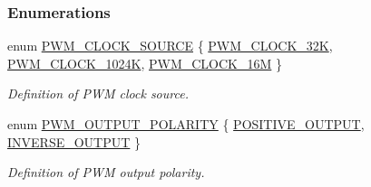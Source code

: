 \subsubsection*{Enumerations}
\begin{DoxyCompactItemize}
\item 
enum \hyperlink{group___p_w_m_ga491cb08538d34ebef5010c3909a0ef4b}{P\+W\+M\+\_\+\+C\+L\+O\+C\+K\+\_\+\+S\+O\+U\+R\+CE} \{ \hyperlink{group___p_w_m_gga491cb08538d34ebef5010c3909a0ef4ba4b5992f696e683361b045709d6f2aa4b}{P\+W\+M\+\_\+\+C\+L\+O\+C\+K\+\_\+32K}, 
\hyperlink{group___p_w_m_gga491cb08538d34ebef5010c3909a0ef4bab50013e096113453cb80304ad877c080}{P\+W\+M\+\_\+\+C\+L\+O\+C\+K\+\_\+1024K}, 
\hyperlink{group___p_w_m_gga491cb08538d34ebef5010c3909a0ef4ba774d8de4fcd984b6a1806567fea3b7c8}{P\+W\+M\+\_\+\+C\+L\+O\+C\+K\+\_\+16M}
 \}\begin{DoxyCompactList}\small\item\em Definition of P\+WM clock source. \end{DoxyCompactList}
\item 
enum \hyperlink{group___p_w_m_ga7129b83fb324f0d2ba78c95815b02f15}{P\+W\+M\+\_\+\+O\+U\+T\+P\+U\+T\+\_\+\+P\+O\+L\+A\+R\+I\+TY} \{ \hyperlink{group___p_w_m_gga7129b83fb324f0d2ba78c95815b02f15a764922273e16ce2ec4d3ecd82a0b3fbe}{P\+O\+S\+I\+T\+I\+V\+E\+\_\+\+O\+U\+T\+P\+UT}, 
\hyperlink{group___p_w_m_gga7129b83fb324f0d2ba78c95815b02f15a5e246186dbaac860a1cc0af6e3e1ea27}{I\+N\+V\+E\+R\+S\+E\+\_\+\+O\+U\+T\+P\+UT}
 \}\begin{DoxyCompactList}\small\item\em Definition of P\+WM output polarity. \end{DoxyCompactList}
\end{DoxyCompactItemize}
